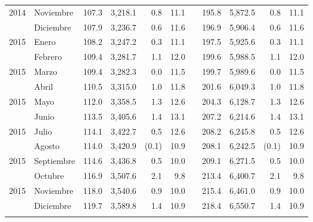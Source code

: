 \begin{center}
\begin{longtable}{llrrrrrrrrr}
		\multicolumn{1}{l}{	2014	}&	Noviembre	&	 107.3 	&	 3,218.1 	&	 0.8 	&	 11.1 	&  &	 195.8 	&	 5,872.5 	&	 0.8 	&	 11.1 	\\
		\rowcolor{color1!5!white}\multicolumn{1}{l}{	2014	}&	Diciembre	&	 107.9 	&	 3,236.7 	&	 0.6 	&	 11.6 	&  &	 196.9 	&	 5,906.4 	&	 0.6 	&	 11.6 	\\
		\multicolumn{1}{l}{	2015	}&	Enero	&	 108.2 	&	 3,247.2 	&	 0.3 	&	 11.1 	&  &	 197.5 	&	 5,925.6 	&	 0.3 	&	 11.1 	\\
		\rowcolor{color1!5!white}\multicolumn{1}{l}{	2015	}&	Febrero	&	 109.4 	&	 3,281.7 	&	 1.1 	&	 12.0 	&  &	 199.6 	&	 5,988.5 	&	 1.1 	&	 12.0 	\\
		\multicolumn{1}{l}{	2015	}&	Marzo	&	 109.4 	&	 3,282.3 	&	 0.0 	&	 11.5 	&  &	 199.7 	&	 5,989.6 	&	 0.0 	&	 11.5 	\\
		\rowcolor{color1!5!white}\multicolumn{1}{l}{	2015	}&	Abril	&	 110.5 	&	 3,315.0 	&	 1.0 	&	 11.8 	&  &	 201.6 	&	 6,049.3 	&	 1.0 	&	 11.8 	\\
		\multicolumn{1}{l}{	2015	}&	Mayo	&	 112.0 	&	 3,358.5 	&	 1.3 	&	 12.6 	&  &	 204.3 	&	 6,128.7 	&	 1.3 	&	 12.6 	\\
		\rowcolor{color1!5!white}\multicolumn{1}{l}{	2015	}&	Junio	&	 113.5 	&	 3,405.6 	&	 1.4 	&	 13.1 	&  &	 207.2 	&	 6,214.6 	&	 1.4 	&	 13.1 	\\
		\multicolumn{1}{l}{	2015	}&	Julio	&	 114.1 	&	 3,422.7 	&	 0.5 	&	 12.6 	&  &	 208.2 	&	 6,245.8 	&	 0.5 	&	 12.6 	\\
		\rowcolor{color1!5!white}\multicolumn{1}{l}{	2015	}&	Agosto	&	 114.0 	&	 3,420.9 	&	 (0.1)	&	 10.9 	&  &	 208.1 	&	 6,242.5 	&	 (0.1)	&	 10.9 	\\
		\multicolumn{1}{l}{	2015	}&	Septiembre	&	 114.6 	&	 3,436.8 	&	 0.5 	&	 10.0 	&  &	 209.1 	&	 6,271.5 	&	 0.5 	&	 10.0 	\\
		\rowcolor{color1!5!white}\multicolumn{1}{l}{	2015	}&	Octubre	&	 116.9 	&	 3,507.6 	&	 2.1 	&	 9.8 	&  &	 213.4 	&	 6,400.7 	&	 2.1 	&	 9.8 	\\
		\multicolumn{1}{l}{	2015	}&	Noviembre	&	 118.0 	&	 3,540.6 	&	 0.9 	&	 10.0 	&  &	 215.4 	&	 6,461.0 	&	 0.9 	&	 10.0 	\\
		\rowcolor{color1!5!white}\multicolumn{1}{l}{	2015	}&	Diciembre	&	 119.7 	&	 3,589.8 	&	 1.4 	&	 10.9 	&  &	 218.4 	&	 6,550.7 	&	 1.4 	&	 10.9 	\\
		\hline
		&&&&&&&&&&\\[-0.28cm]
	\end{longtable}
\end{center}

